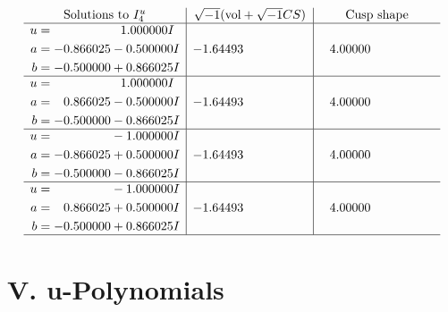 \documentclass[1p]{elsarticle_modified}
\theoremstyle{definition}
\newcommand{\I}{\sqrt{-1}}
\begin{document}
$$\begin{array}{c|c|c}  
\text{Solutions to }I^u_{4}& \I (\text{vol} + \sqrt{-1}CS) & \text{Cusp shape}\\
 \hline 
\begin{aligned}
u &= \phantom{-0.000000 -}1.000000 I \\
a &= -0.866025 - 0.500000 I \\
b &= -0.500000 + 0.866025 I\end{aligned}
 & -1.64493\phantom{ +0.000000I} & \phantom{-}4.00000\phantom{ +0.000000I} \\ \hline\begin{aligned}
u &= \phantom{-0.000000 -}1.000000 I \\
a &= \phantom{-}0.866025 - 0.500000 I \\
b &= -0.500000 - 0.866025 I\end{aligned}
 & -1.64493\phantom{ +0.000000I} & \phantom{-}4.00000\phantom{ +0.000000I} \\ \hline\begin{aligned}
u &= \phantom{-0.000000 } -1.000000 I \\
a &= -0.866025 + 0.500000 I \\
b &= -0.500000 - 0.866025 I\end{aligned}
 & -1.64493\phantom{ +0.000000I} & \phantom{-}4.00000\phantom{ +0.000000I} \\ \hline\begin{aligned}
u &= \phantom{-0.000000 } -1.000000 I \\
a &= \phantom{-}0.866025 + 0.500000 I \\
b &= -0.500000 + 0.866025 I\end{aligned}
 & -1.64493\phantom{ +0.000000I} & \phantom{-}4.00000\phantom{ +0.000000I}\\
 \hline 
 \end{array}$$\newpage
\newpage\renewcommand{\arraystretch}{1}
\centering \section*{ V. u-Polynomials}
\end{document}
